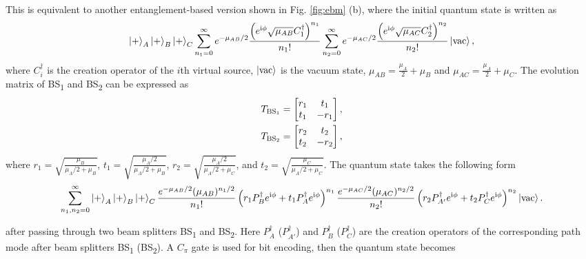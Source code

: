 \documentclass[aps,twocolumn,superscriptaddress,showpacs,nofootinbib]{revtex4-2}
\renewcommand{\i}{\mathrm{i}}
\begin{document}
\begin{widetext}

This is equivalent to another entanglement-based version shown in Fig. \ref{fig:ebm} (b), where the initial quantum state is written as
\begin{equation}
\ket{+}_{A}\ket{+}_{B}\ket{+}_{C}\sum_{n_1=0}^{\infty}e^{-\mu_{AB}/2}\frac{\left(e^{\i \phi}\sqrt{\mu_{AB}}C^\dagger_1\right)^{n_1}}{n_1!}\sum_{n_2=0}^{\infty}e^{-\mu_{AC}/2}\frac{\left(e^{\i \phi}\sqrt{\mu_{AC}}C^\dagger_2\right)^{n_2}}{n_2!} \ket{\text{vac}},
\end{equation}
where  $C^\dagger_i$ is the creation operator of the $i$th virtual source, $\ket{\text{vac}}$ is the vacuum state, $\mu_{AB} = \frac{\mu_A}{2} + \mu_B$ and $\mu_{AC} = \frac{\mu_A}{2} + \mu_C$. The evolution matrix of BS\textsubscript{1} and BS\textsubscript{2} can be expressed as
\begin{equation} \label{eq:BS}
\begin{split}
T_\text{BS\textsubscript{1}} &=
\begin{bmatrix}
	r_1 & t_1 \\
	t_1 & -r_1
	\end{bmatrix},\\
T_\text{BS\textsubscript{2}} &=
\begin{bmatrix}
	r_2 & t_2 \\
	t_2 & -r_2
	\end{bmatrix},
\end{split}
\end{equation}
where $r_1 = \sqrt{\frac{\mu_B}{\mu_A/2+\mu_B}}$, $t_1 = \sqrt{\frac{\mu_A/2}{\mu_A/2+\mu_B}}$, $r_2 = \sqrt{\frac{\mu_A/2}{\mu_A/2+\mu_C}}$, and $t_2 = \sqrt{\frac{\mu_C}{\mu_A/2+\mu_C}}$. The quantum state takes the following form
\begin{equation}
\sum_{n_1,n_2=0}^{\infty} \ket{+}_{A}\ket{+}_{B}\ket{+}_{C} \frac{e^{-\mu_{AB}/2}(\mu_{AB})^{n_1/2}}{n_1!} \left( r_1 P^\dagger_B e^{\i \phi} + t_1 P^\dagger_{A} e^{\i \phi} \right)^{n_1} \frac{e^{-\mu_{AC}/2}(\mu_{AC})^{n_2/2}}{n_2!} \left( r_2 P^\dagger_{A'} e^{\i \phi} + t_2 P^\dagger_{C} e^{\i \phi} \right)^{n_2} \ket{\text{vac}}.
\end{equation}

after passing through two beam splitters BS\textsubscript{1} and BS\textsubscript{2}. Here $P^\dagger_{A}$ ($P^\dagger_{A'}$) and $P^\dagger_{B}$ ($P^\dagger_{C}$) are the creation operators of the corresponding path mode after beam splitters BS\textsubscript{1} (BS\textsubscript{2}).
A $C_\pi$ gate is used for bit encoding, then the quantum state becomes


\end{widetext}
\end{document}
